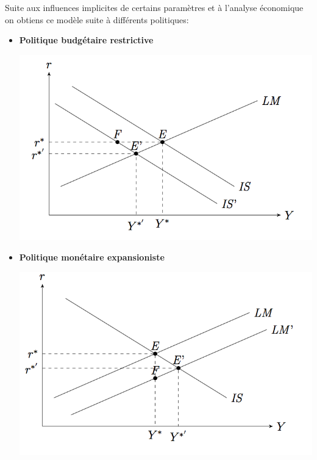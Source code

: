 \begin{tcolorbox}[title= Modèle IS-LM]
Suite aux influences implicites de certains paramètres et à l'analyse économique on obtiens ce modèle suite à différents politiques:
\begin{itemize}[label=]
	
	\item \textbf{Politique budgétaire restrictive}
	
		\begin{center}
			\includegraphics[scale=0.5]{./img/im5}
		\end{center}
	    \label{fig:modele_islm_rest}
		
	 \item \textbf{Politique monétaire expansioniste}
	
		\begin{center}
			\includegraphics[scale=0.5]{./img/im6}
		\end{center}
	    \label{fig:modele_islm_exp}
\end{itemize}

\end{tcolorbox}

